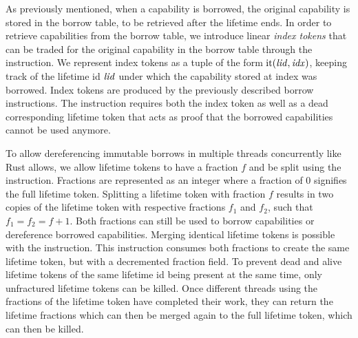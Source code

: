 As previously mentioned, when a capability is borrowed, the original capability is stored in the borrow table, to be retrieved after the lifetime ends.
In order to retrieve capabilities from the borrow table, we introduce linear \emph{index tokens} that can be traded for the original capability in the borrow table through the  instruction.
We represent index tokens as a tuple of the form $\mathrm{it}(\mathit{lid},\mathit{idx})$, keeping track of the lifetime id $\mathit{lid}$ under which the capability stored at index  was borrowed.
Index tokens are produced by the previously described borrow instructions.
The  instruction requires both the index token as well as a dead corresponding lifetime token that acts as proof that the borrowed capabilities cannot be used anymore.

To allow dereferencing immutable borrows in multiple threads concurrently like Rust allows, we allow lifetime tokens to have a fraction $f$ and be split using the  instruction.
Fractions are represented as an integer where a fraction of 0 signifies the full lifetime token.
Splitting a lifetime token with fraction $f$ results in two copies of the lifetime token with respective fractions $f_1$ and $f_2$, such that $f_1 = f_2 = f + 1$.
Both fractions can still be used to borrow capabilities or dereference borrowed capabilities.
Merging identical lifetime tokens is possible with the  instruction.
This instruction consumes both fractions to create the same lifetime token, but with a decremented fraction field.
To prevent dead and alive lifetime tokens of the same lifetime id being present at the same time, only unfractured lifetime tokens can be killed.
Once different threads using the fractions of the lifetime token have completed their work, they can return the lifetime fractions which can then be merged again to the full lifetime token, which can then be killed.

